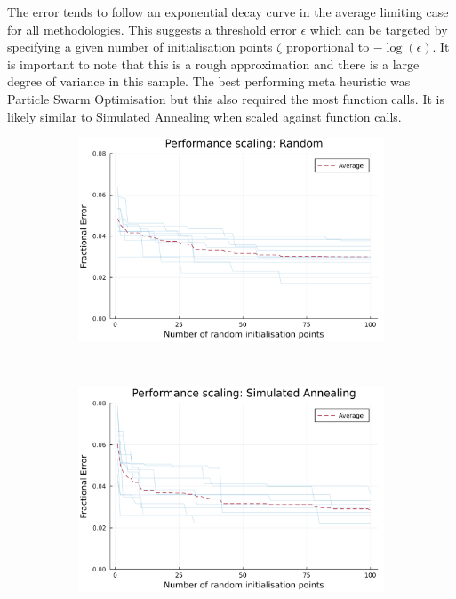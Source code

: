 The error tends to follow an exponential decay curve in the average limiting case for all methodologies. This suggests a threshold error $\epsilon$ which can be targeted by specifying a given number of initialisation points $\zeta$ proportional to $-\log(\epsilon)$. It is important to note that this is a rough approximation and there is a large degree of variance in this sample. The best performing meta heuristic was Particle Swarm Optimisation but this also required the most function calls. It is likely similar to Simulated Annealing when scaled against function calls.
\begin{figure}
	\begin{subfigure}{0.7\textwidth}
		\centering
		\includegraphics[width=\textwidth]{images/elastic_neighbourhood/fig_initialisation_npoints_random}
		\caption{}
	\end{subfigure}
~
	\begin{subfigure}{0.7\textwidth}
	\centering
	\includegraphics[width=\textwidth]{images/elastic_neighbourhood/fig_initialisation_npoints_simulated_annealing}

\end{subfigure}
\end{figure}
